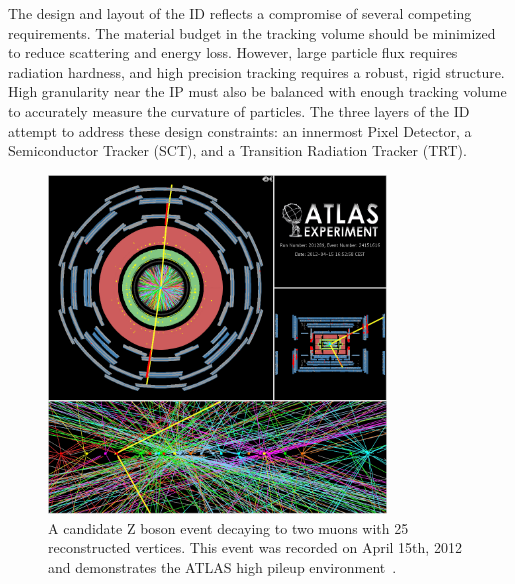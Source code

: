 The design and layout of the ID reflects a compromise of several competing requirements. The material budget in the tracking volume
should be minimized to reduce scattering and energy loss. However, 
large particle flux requires radiation hardness, and high precision tracking requires a robust, rigid structure. High granularity near the IP must also be balanced with enough tracking volume to accurately measure the curvature of particles. The three layers of the ID attempt to address these design constraints: an innermost Pixel Detector, a Semiconductor Tracker (SCT), and a Transition Radiation Tracker (TRT).  
\begin{figure}[tbp]
    \begin{center}
    \includegraphics[width=0.8\textwidth]{figures/Atlas/25ver_zmumu}
    \caption[High vertex multiplicity event]{A candidate Z boson event decaying to two muons with 25 reconstructed vertices. This event was recorded on April 15th, 2012 and demonstrates the ATLAS high pileup environment~\cite{25_vertices_z}.}
    \label{fig:25_ver_zmumu}
    \end{center}
\end{figure}


